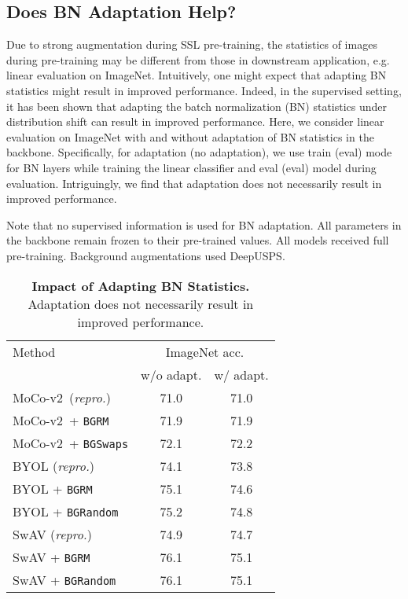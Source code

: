 \documentclass[twoside,11pt]{article}
\newcommand{\bgrm}{\texttt{BG\textunderscore RM}}
\newcommand{\bgswaps}{\texttt{BG\textunderscore Swaps}}
\newcommand{\bgrand}{\texttt{BG\textunderscore Random}}
\newcommand{\moco}{MoCo-v2}
\begin{document}
\subsection{Does BN Adaptation Help?}

Due to strong augmentation during SSL pre-training, the statistics of images during pre-training may be different from those in downstream application, e.g. linear evaluation on ImageNet. Intuitively, one might expect that adapting BN statistics might result in improved performance. Indeed, in the supervised setting, it has been shown \citep{schneider_improving_2020, nado_evaluating_2020} that adapting the batch normalization (BN) statistics under distribution shift can result in improved performance.  Here, we consider linear evaluation on ImageNet with and without adaptation of BN statistics in the backbone. Specifically, for adaptation (no adaptation), we use train (eval) mode for BN layers while training the linear classifier and eval (eval) model during evaluation. Intriguingly, we find that adaptation does not necessarily result in improved performance. 

Note that no supervised information is used for BN adaptation. All parameters in the backbone remain frozen to their pre-trained values. All models received full pre-training. Background augmentations used DeepUSPS. 


\begin{table}
    \centering
     \begin{tabular}{lcc}\toprule
    Method  &  \multicolumn{2}{c}{ImageNet acc.}\\
          &  w/o adapt.  & w/ adapt. \\\midrule
    \moco~{\scriptsize{(\textit{repro.})}}  & 71.0 & 71.0 \\
    \moco~+ \bgrm  & 71.9 & 71.9 \\
    \moco~+ \bgswaps  & 72.1 & 72.2 \\
    BYOL {\scriptsize{(\textit{repro.})}} & 74.1 & 73.8 \\
    BYOL + \bgrm & 75.1 & 74.6 \\
    BYOL + \bgrand &  75.2 & 74.8 \\
    SwAV {\scriptsize{(\textit{repro.})}} & 74.9 & 74.7 \\
    SwAV + \bgrm  & 76.1 &  75.1 \\
    SwAV + \bgrand & 76.1 &  75.1 \\
    \bottomrule
    \end{tabular}
    \caption{
    \textbf{Impact of Adapting BN Statistics.} Adaptation does not necessarily result in improved performance.
    }
    \label{tab:adapt_bn_imnet_lin_eval}
\end{table}
\end{document}
